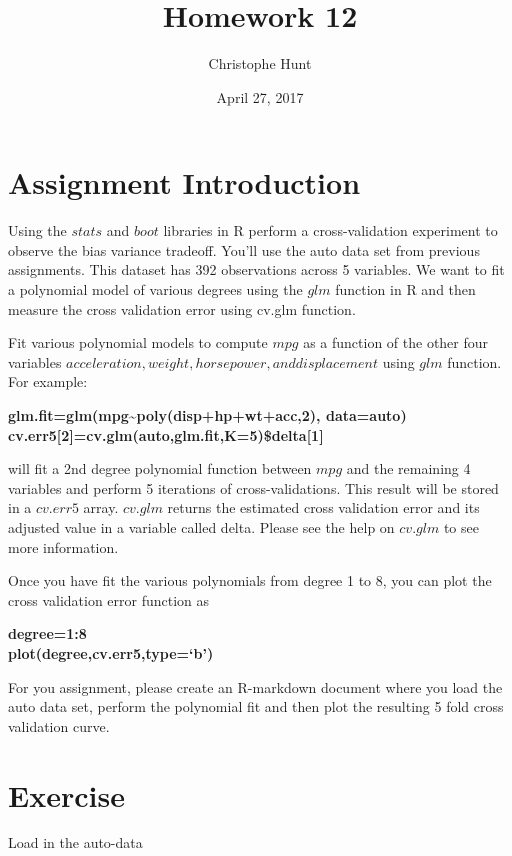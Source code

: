 \documentclass[]{article}
\title{Homework 12}
\author{Christophe Hunt}
\date{April 27, 2017}
\begin{document}
\maketitle

{
\setcounter{tocdepth}{2}
\tableofcontents
}
\section{Assignment Introduction}\label{assignment-introduction}

Using the \(stats\) and \(boot\) libraries in R perform a
cross-validation experiment to observe the bias variance tradeoff.
You'll use the auto data set from previous assignments. This dataset has
392 observations across 5 variables. We want to fit a polynomial model
of various degrees using the \(glm\) function in R and then measure the
cross validation error using cv.glm function.

Fit various polynomial models to compute \(mpg\) as a function of the
other four variables
\(acceleration, weight, horsepower, and displacement\) using \(glm\)
function. For example:

\textbf{glm.fit=glm(mpg\textasciitilde{}poly(disp+hp+wt+acc,2),
data=auto)}\\
\textbf{cv.err5{[}2{]}=cv.glm(auto,glm.fit,K=5)\$delta{[}1{]}}

will fit a 2nd degree polynomial function between \(mpg\) and the
remaining 4 variables and perform 5 iterations of cross-validations.
This result will be stored in a \(cv.err5\) array. \(cv.glm\) returns
the estimated cross validation error and its adjusted value in a
variable called delta. Please see the help on \(cv.glm\) to see more
information.

Once you have fit the various polynomials from degree 1 to 8, you can
plot the cross validation error function as

\textbf{degree=1:8}\\
\textbf{plot(degree,cv.err5,type=`b')}

For you assignment, please create an R-markdown document where you load
the auto data set, perform the polynomial fit and then plot the
resulting 5 fold cross validation curve.

\section{Exercise}\label{exercise}

Load in the auto-data
\end{document}
